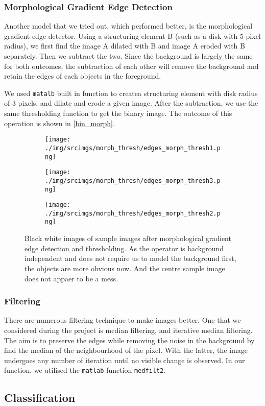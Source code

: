 \documentclass[main.tex]{subfiles}
\begin{document}
\subsubsection*{Morphological Gradient Edge Detection}
Another model that we tried out, which performed better, is the morphological gradient edge detector. Using a structuring element B (such as a disk with 5 pixel radius), we first find the  image A dilated with B and image A eroded with B separately. Then we subtract the two. Since the background is largely the same for both outcomes, the subtraction of each other will remove the background and retain the edges of each objects in the foreground.

We used \texttt{matalb} built in function to createa structuring element with disk radius of 3 pixels, and dilate and erode a given image. After the subtraction, we use the same thresholding function to get the binary image. The outcome of this operation is shown in \autoref{bin_morph}.

\begin{figure}[!h]
  \centering
  \begin{subfigure}[b]{.3\textwidth}
    \centering
    \texttt{[image: ./img/srcimgs/morph\_thresh/edges\_morph\_thresh1.png]}
  \end{subfigure}
  \begin{subfigure}[b]{.3\textwidth}
    \centering
    \texttt{[image: ./img/srcimgs/morph\_thresh/edges\_morph\_thresh3.png]}
  \end{subfigure}
  \begin{subfigure}[b]{.3\textwidth}
    \centering
    \texttt{[image: ./img/srcimgs/morph\_thresh/edges\_morph\_thresh2.png]}
  \end{subfigure}
  \caption{Black white images of sample images after morphological gradient edge detection and thresholding. As the operator is background independent and does not require us to model the background first, the objects are more obvious now. And the centre sample image does not appaer to be a mess.}
  \label{bin_morph}
\end{figure}

\subsubsection*{Filtering}
There are numerous filtering technique to make images better. One that we considered during the project is median filtering, and iterative median filtering. The aim is to preserve the edges while removing the noise in the background by find the median of the neighbourhood of the pixel. With the latter, the image undergoes any number of iteration until no visible change is observed. In our function, we utilised the \texttt{matlab} function \texttt{medfilt2}.

\subsection{Classification}
\end{document}

